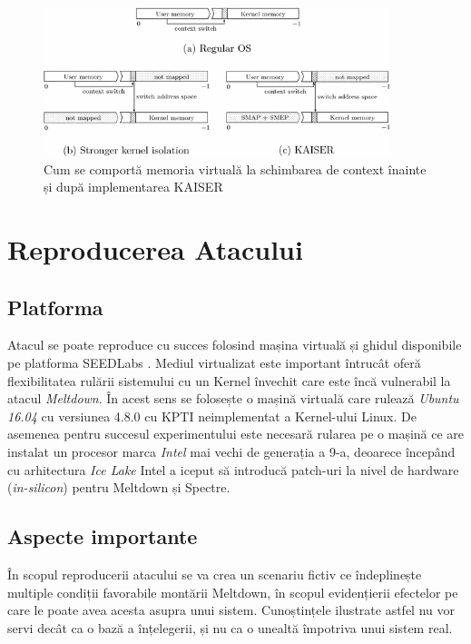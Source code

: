 \begin{figure}[ht]
	\centering
	\includegraphics[width=0.9\textwidth]{images/shadowspace.png}
  \caption{Cum se comportă memoria virtuală la schimbarea de context înainte și
      după implementarea KAISER \cite{gruss2017kaslr}}
  \label{fig:shadowspace}
\end{figure}

\section{Reproducerea Atacului}

\subsection{Platforma}

Atacul se poate reproduce cu succes folosind mașina virtuală și ghidul
disponibile pe platforma SEEDLabs \cite{seedlabs_meltdown}. Mediul virtualizat
este important întrucât oferă flexibilitatea rulării sistemului cu un Kernel
învechit care este încă vulnerabil la atacul \emph{Meltdown}. În acest sens se
folosește o mașină virtuală care rulează \emph{Ubuntu 16.04} cu versiunea 4.8.0
cu KPTI neimplementat a Kernel-ului Linux. De asemenea pentru succesul
experimentului este necesară rularea pe o mașină ce are instalat un procesor
marca \emph{Intel} mai vechi de generația a 9-a, deoarece începând cu arhitectura
\emph{Ice Lake} Intel a iceput să introducă patch-uri la nivel de hardware
(\emph{in-silicon}) pentru Meltdown și Spectre.

\subsection{Aspecte importante}

În scopul reproducerii atacului se va crea un scenariu fictiv ce îndeplinește
multiple condiții favorabile montării Meltdown, în scopul evidențierii 
efectelor pe care le poate avea acesta asupra unui sistem. Cunoștințele 
ilustrate astfel nu vor servi decât ca o bază a înțelegerii, și nu ca o unealtă
împotriva unui sistem real.

